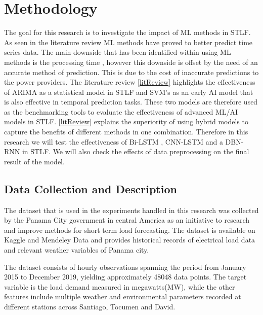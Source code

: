 \chapter{Methodology}

The goal for this research is to investigate the impact of ML methods in STLF. As seen in the literature review ML methods have proved to better predict time series data. The main downside that has been identified within using ML methods is the processing time , however this downside is offset by the need of an accurate method of prediction. This is due to the cost of inaccurate predictions to the power providers. The literature review \ref{litReview} highlights the effectiveness of ARIMA as a statistical model in STLF and SVM's as an early AI model that is also effective in temporal prediction tasks. These two models are therefore used as the benchmarking tools to evaluate the effectiveness of advanced ML/AI models in STLF. \ref{litReview} explains the superiority of using hybrid models to capture the benefits of different methods in one combination. Therefore in this research we will test the effectiveness of Bi-LSTM , CNN-LSTM and a DBN-RNN in STLF. We will also check the effects of data preprocessing on the final result of the model.

\section{Data Collection and Description}
The dataset that is used in the experiments handled in this research was collected by the Panama City government in central America as an initiative to research and improve  methods for short term load forecasting. The dataset is available on Kaggle and  Mendeley Data and provides historical records of electrical load data and relevant weather variables of Panama city\cite{dataset}.

The dataset consists of hourly observations spanning the period from January 2015 to December 2019, yielding approximately 48048 data points. The target variable is the load demand measured in megawatts(MW), while the other features include multiple weather and environmental parameters recorded at different stations across Santiago, Tocumen and David. 

